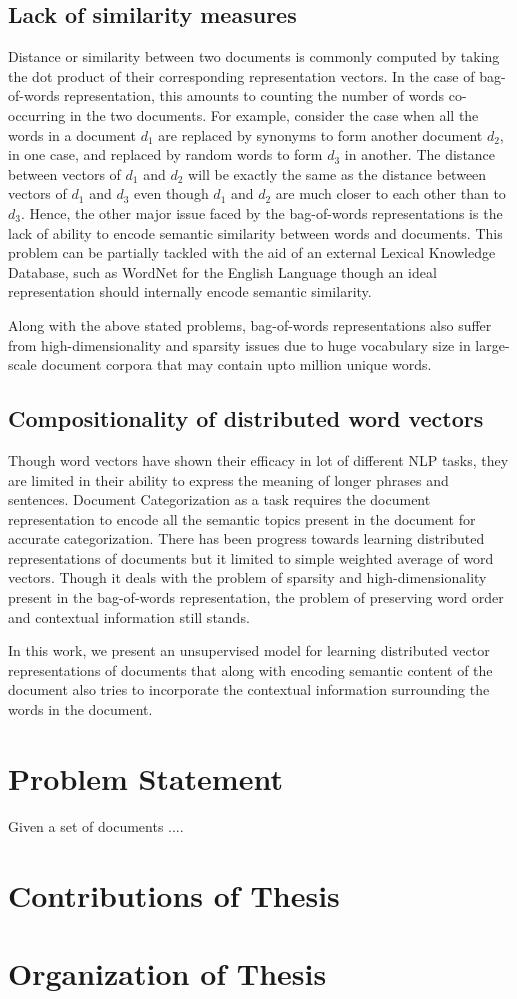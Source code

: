 \subsection{Lack of similarity measures}
Distance or similarity between two documents is commonly computed by taking the dot product of their corresponding representation vectors. In the case of bag-of-words representation, this amounts to counting the number of words co-occurring in the two documents. For example, consider the case when all the words in a document $d_{1}$ are replaced by synonyms to form another document $d_{2}$, in one case, and replaced by random words to form $d_{3}$ in another. The distance between vectors of $d_{1}$ and $d_{2}$ will be exactly the same as the distance between vectors of $d_{1}$ and $d_{3}$ even though $d_{1}$ and $d_{2}$ are much closer to each other than to $d_{3}$. 
Hence, the other major issue faced by the bag-of-words representations is the lack of ability to encode semantic similarity between words and documents. 
This problem can be partially tackled with the aid of an external Lexical Knowledge Database, such as WordNet for the English Language though an ideal representation should internally encode semantic similarity.

Along with the above stated problems, bag-of-words representations also suffer from high-dimensionality and sparsity issues due to huge vocabulary size in large-scale document corpora that may contain upto million unique words.

\subsection{Compositionality of distributed word vectors}
Though word vectors have shown their efficacy in lot of different NLP tasks, they are limited in their ability to express the meaning of longer phrases and sentences. Document Categorization as a task requires the document representation to encode all the semantic topics present in the document for accurate categorization. There has been progress towards learning distributed representations of documents but it limited to simple weighted average of word vectors. Though it deals with the problem of sparsity and high-dimensionality present in the bag-of-words representation, the problem of preserving word order and contextual information still stands.

In this work, we present an unsupervised model for learning distributed vector representations of documents that along with encoding semantic content of the document also tries to incorporate the contextual information surrounding the words in the document.

\section{Problem Statement}	
Given a set of documents ....

\section{Contributions of Thesis}

\section{Organization of Thesis}







